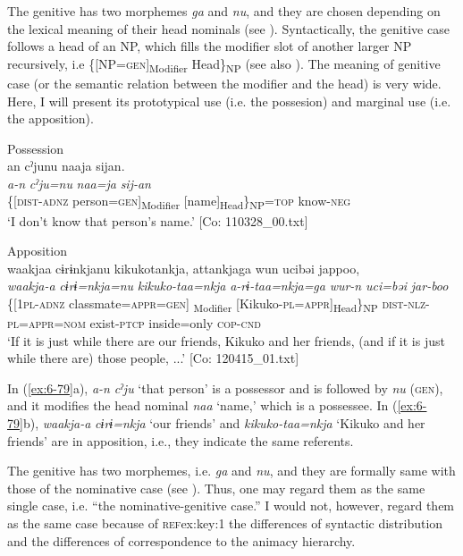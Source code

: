 The genitive has two morphemes \textit{ga} and \textit{nu}, and they are chosen depending on the lexical meaning of their head nominals (see ). Syntactically, the genitive case follows a head of an NP, which fills the modifier slot of another larger NP recursively, i.e \{[NP=\textsc{gen}]\textsubscript{Modifier} Head\}\textsubscript{NP} (see also ). The meaning of genitive case (or the semantic relation between the modifier and the head) is very wide. Here, I will present its prototypical use (i.e. the possesion) and marginal use (i.e. the apposition).

\ea\label{ex:6-79}
\ea Possession\\
{\TM}
\glll  an  cˀjunu  naaja  sijan.\\
\textit{a-n}  \textit{cˀju=nu}  \textit{naa=ja}  \textit{sij-an}\\
\{[\textsc{dist}-\textsc{adnz}  person=\textsc{gen}]\textsubscript{Modifier}  [name]\textsubscript{Head}\}\textsubscript{NP}=\textsc{top}  know-\textsc{neg}\\
\glt ‘I don’t know that person’s name.’ [Co: 110328\_00.txt]

\ex Apposition\\
{\TM}
\glll  waakjaa  cɨrɨnkjanu  kikukotankja,    attankjaga  wun  ucibəi  jappoo,\\
\textit{waakja-a}  \textit{cɨrɨ=nkja=nu}  \textit{kikuko-taa=nkja}    \textit{a-rɨ-taa=nkja=ga}  \textit{wur-n}  \textit{uci=bəi}  \textit{jar-boo}\\
\{[1\textsc{pl}-\textsc{adnz}  classmate=\textsc{appr}=\textsc{gen}]\textsubscript{ Modifier}  [Kikuko-\textsc{pl}=\textsc{appr}]\textsubscript{Head}\}\textsubscript{NP}  \textsc{dist}-\textsc{nlz}-\textsc{pl}=\textsc{appr}=\textsc{nom}  exist-\textsc{ptcp}  inside=only  \textsc{cop}-\textsc{cnd}\\
\glt ‘If it is just while there are our friends, Kikuko and her friends, (and if it is just while there are) those people, ...’ [Co: 120415\_01.txt]
\z
\z

In (\ref{ex:6-79}a), \textit{a-n} \textit{cˀju} ‘that person’ is a possessor and is followed by \textit{nu} (\textsc{gen}), and it modifies the head nominal \textit{naa} ‘name,’ which is a possessee. In (\ref{ex:6-79}b), \textit{waakja-a} \textit{cɨrɨ=nkja} ‘our friends’ and \textit{kikuko-taa=nkja} ‘Kikuko and her friends’ are in apposition, i.e., they indicate the same referents.

The genitive has two morphemes, i.e. \textit{ga} and \textit{nu}, and they are formally same with those of the nominative case (see ). Thus, one may regard them as the same single case, i.e. “the nominative-genitive case.” I would not, however, regard them as the same case because of \textsc{ref}{ex:key:1} the differences of syntactic distribution and  the differences of correspondence to the animacy hierarchy.

